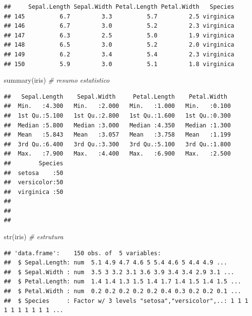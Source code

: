 \documentclass[
]{book}
\newenvironment{Shaded}{\begin{snugshade}}{\end{snugshade}}
\newcommand{\CommentTok}[1]{\textcolor[rgb]{0.56,0.35,0.01}{\textit{#1}}}
\newcommand{\FunctionTok}[1]{\textcolor[rgb]{0.00,0.00,0.00}{#1}}
\newcommand{\NormalTok}[1]{#1}
\begin{document}
\begin{verbatim}
##     Sepal.Length Sepal.Width Petal.Length Petal.Width   Species
## 145          6.7         3.3          5.7         2.5 virginica
## 146          6.7         3.0          5.2         2.3 virginica
## 147          6.3         2.5          5.0         1.9 virginica
## 148          6.5         3.0          5.2         2.0 virginica
## 149          6.2         3.4          5.4         2.3 virginica
## 150          5.9         3.0          5.1         1.8 virginica
\end{verbatim}

\begin{Shaded}
\begin{Highlighting}[]
\FunctionTok{summary}\NormalTok{(iris)     }\CommentTok{\# resumo estatistico}
\end{Highlighting}
\end{Shaded}

\begin{verbatim}
##   Sepal.Length    Sepal.Width     Petal.Length    Petal.Width   
##  Min.   :4.300   Min.   :2.000   Min.   :1.000   Min.   :0.100  
##  1st Qu.:5.100   1st Qu.:2.800   1st Qu.:1.600   1st Qu.:0.300  
##  Median :5.800   Median :3.000   Median :4.350   Median :1.300  
##  Mean   :5.843   Mean   :3.057   Mean   :3.758   Mean   :1.199  
##  3rd Qu.:6.400   3rd Qu.:3.300   3rd Qu.:5.100   3rd Qu.:1.800  
##  Max.   :7.900   Max.   :4.400   Max.   :6.900   Max.   :2.500  
##        Species  
##  setosa    :50  
##  versicolor:50  
##  virginica :50  
##                 
##                 
## 
\end{verbatim}

\begin{Shaded}
\begin{Highlighting}[]
\FunctionTok{str}\NormalTok{(iris)         }\CommentTok{\# estrutura}
\end{Highlighting}
\end{Shaded}

\begin{verbatim}
## 'data.frame':    150 obs. of  5 variables:
##  $ Sepal.Length: num  5.1 4.9 4.7 4.6 5 5.4 4.6 5 4.4 4.9 ...
##  $ Sepal.Width : num  3.5 3 3.2 3.1 3.6 3.9 3.4 3.4 2.9 3.1 ...
##  $ Petal.Length: num  1.4 1.4 1.3 1.5 1.4 1.7 1.4 1.5 1.4 1.5 ...
##  $ Petal.Width : num  0.2 0.2 0.2 0.2 0.2 0.4 0.3 0.2 0.2 0.1 ...
##  $ Species     : Factor w/ 3 levels "setosa","versicolor",..: 1 1 1 1 1 1 1 1 1 1 ...
\end{verbatim}
\end{document}
